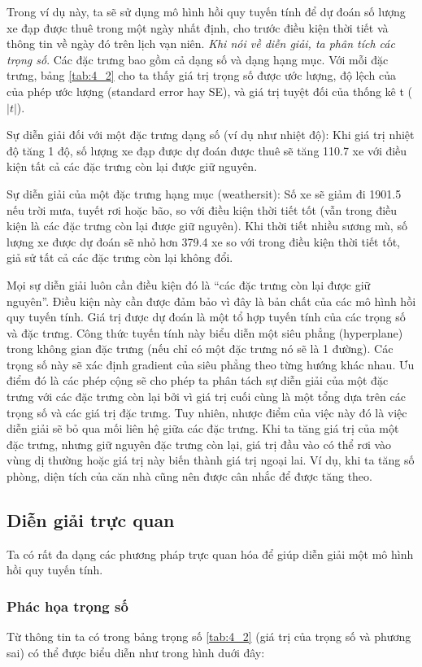Trong ví dụ này, ta sẽ sử dụng mô hình hồi quy tuyến tính để dự đoán số lượng xe đạp được thuê trong một ngày nhất định, cho trước điều kiện thời tiết và thông tin về ngày đó trên lịch vạn niên. \textit{Khi nói về diễn giải, ta phân tích các trọng số}. Các đặc trưng bao gồm cả dạng số và dạng hạng mục. Với mỗi đặc trưng, bảng \ref{tab:4_2} cho ta thấy giá trị trọng số được ước lượng, độ lệch của của phép ước lượng (standard error hay SE), và giá trị tuyệt đối của thống kê t ($|t|$).


Sự diễn giải đối với một đặc trưng dạng số (ví dụ như nhiệt độ): Khi giá trị nhiệt độ tăng 1 độ, số lượng xe đạp được dự đoán được thuê sẽ tăng 110.7 xe với điều kiện tất cả các đặc trưng còn lại được giữ nguyên.

Sự diễn giải của một đặc trưng hạng mục (weathersit): Số xe sẽ giảm đi 1901.5 nếu trời mưa, tuyết rơi hoặc bão, so với điều kiện thời tiết tốt (vẫn trong điều kiện là các đặc trưng còn lại được giữ nguyên). Khi thời tiết nhiều sương mù, số lượng xe được dự đoán sẽ nhỏ hơn 379.4 xe so với trong điều kiện thời tiết tốt, giả sử tất cả các đặc trưng còn lại không đổi.

Mọi sự diễn giải luôn cần điều kiện đó là ``các đặc trưng còn lại được giữ nguyên''. Điều kiện này cần được đảm bảo vì đây là bản chất của các mô hình hồi quy tuyến tính. Giá trị được dự đoán là một tổ hợp tuyến tính của các trọng số và đặc trưng. Công thức tuyến tính này biểu diễn một siêu phẳng (hyperplane) trong không gian đặc trưng (nếu chỉ có một đặc trưng nó sẽ là 1 đường). Các trọng số này sẽ xác định gradient của siêu phẳng theo từng hướng khác nhau. Ưu điểm đó là các phép cộng sẽ cho phép ta phân tách sự diễn giải của một đặc trưng với các đặc trưng còn lại bởi vì giá trị cuối cùng là một tổng dựa trên các trọng số và các giá trị đặc trưng. Tuy nhiên, nhược điểm của việc này đó là việc diễn giải sẽ bỏ qua mối liên hệ giữa các đặc trưng. Khi ta tăng giá trị của một đặc trưng, nhưng giữ nguyên đặc trưng còn lại, giá trị đầu vào có thể rơi vào vùng dị thường hoặc giá trị này biến thành giá trị ngoại lai. Ví dụ, khi ta tăng số phòng, diện tích của căn nhà cũng nên được cân nhắc để được tăng theo.

\subsection{Diễn giải trực quan}
Ta có rất đa dạng các phương pháp trực quan hóa để giúp diễn giải một mô hình hồi quy tuyến tính.

\subsubsection{Phác họa trọng số}
Từ thông tin ta có trong bảng trọng số \ref{tab:4_2} (giá trị của trọng số và phương sai) có thể được biểu diễn như trong hình duới đây:

